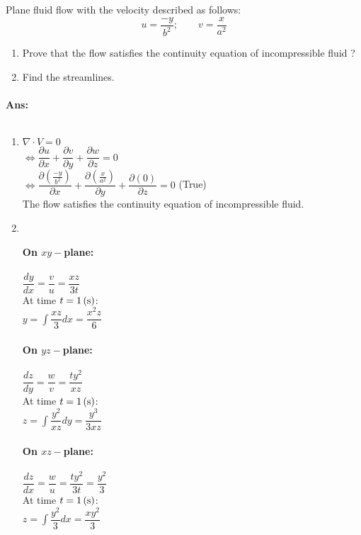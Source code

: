 \section{}
\section{}
Plane fluid flow with the velocity described as follows:
\[u=\dfrac{-y}{b^2};\qquad v =\dfrac{x}{a^2}\]
\begin{enumerate}
	\item Prove that the flow satisfies the continuity equation of incompressible fluid ?
	\item Find the streamlines.
\end{enumerate}
\paragraph{Ans:}$  $\\
\begin{enumerate}
	\item $ \nabla \cdot V=0 $\\
	$\Leftrightarrow \dfrac{\partial u}{\partial x} + \dfrac{\partial v}{\partial y} + \dfrac{\partial w}{\partial z}=0$\\
	$ \Leftrightarrow \dfrac{\partial (\frac{-y}{b^2})}{\partial x} + \dfrac{\partial (\frac{x}{a^2})}{\partial y} + \dfrac{\partial (0)}{\partial z} =0$ (True)\\
	The flow satisfies the continuity equation of incompressible fluid.
	\item $ $
	\paragraph{On $ xy- $plane:}
	$ \dfrac{dy}{dx} = \dfrac{v}{u} = \dfrac{xz}{3t}$\\
	At time $ t=1\, (\mathrm{s}) $:\\
	$\displaystyle y=\int\dfrac{xz}{3}dx = \dfrac{x^2z}{6} $
	\paragraph{On $ yz- $plane:}
	$ \dfrac{dz}{dy} = \dfrac{w}{v} = \dfrac{ty^2}{xz}$\\
	At time $ t=1\, (\mathrm{s}) $:\\
	$\displaystyle z=\int\dfrac{y^2}{xz}dy = \dfrac{y^3}{3xz} $
	\paragraph{On $ xz- $plane:}
	$ \dfrac{dz}{dx} = \dfrac{w}{u} = \dfrac{ty^2}{3t}=\dfrac{y^2}{3}$\\
	At time $ t=1\, (\mathrm{s}) $:\\
	$\displaystyle z=\int\dfrac{y^2}{3}dx = \dfrac{xy^2}{3} $
\end{enumerate}